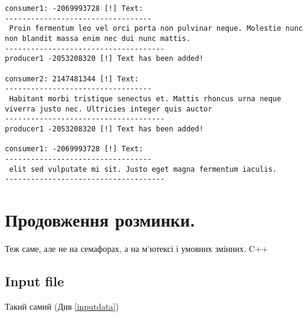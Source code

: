 \documentclass{article}
\begin{document}
\begin{lstlisting}[]
consumer1: -2069993728 [!] Text: 
----------------------------------
 Proin fermentum leo vel orci porta non pulvinar neque. Molestie nunc non blandit massa enim nec dui nunc mattis. 
-------------------------------------
producer1 -2053208320 [!] Text has been added! 

consumer2: 2147481344 [!] Text: 
----------------------------------
 Habitant morbi tristique senectus et. Mattis rhoncus urna neque viverra justo nec. Ultricies integer quis auctor
-------------------------------------
producer1 -2053208320 [!] Text has been added! 

consumer1: -2069993728 [!] Text: 
----------------------------------
 elit sed vulputate mi sit. Justo eget magna fermentum iaculis.
-------------------------------------

\end{lstlisting}


\newpage
\section{Продовження розминки.}
\large Теж саме, але не на семафорах, а на м’ютексі і
умовних змінних. 
C++

\subsection{Input file}

Такий самий (Див \ref{inputdata})
\end{document}

